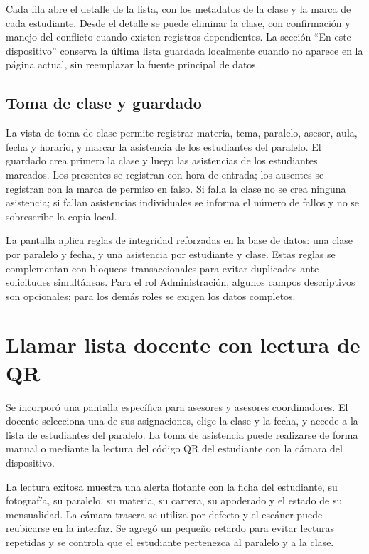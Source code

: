 \documentclass[12pt,a4paper,oneside]{report}
\begin{document}
Cada fila abre el detalle de la lista, con los metadatos de la clase y la marca de cada estudiante. Desde el detalle se puede eliminar la clase, con confirmación y manejo del conflicto cuando existen registros dependientes. La sección ``En este dispositivo'' conserva la última lista guardada localmente cuando no aparece en la página actual, sin reemplazar la fuente principal de datos.

\subsection{Toma de clase y guardado}

La vista de toma de clase permite registrar materia, tema, paralelo, asesor, aula, fecha y horario, y marcar la asistencia de los estudiantes del paralelo. El guardado crea primero la clase y luego las asistencias de los estudiantes marcados. Los presentes se registran con hora de entrada; los ausentes se registran con la marca de permiso en falso. Si falla la clase no se crea ninguna asistencia; si fallan asistencias individuales se informa el número de fallos y no se sobrescribe la copia local.

La pantalla aplica reglas de integridad reforzadas en la base de datos: una clase por paralelo y fecha, y una asistencia por estudiante y clase. Estas reglas se complementan con bloqueos transaccionales para evitar duplicados ante solicitudes simultáneas. Para el rol Administración, algunos campos descriptivos son opcionales; para los demás roles se exigen los datos completos.

\section{Llamar lista docente con lectura de QR}

Se incorporó una pantalla específica para asesores y asesores coordinadores. El docente selecciona una de sus asignaciones, elige la clase y la fecha, y accede a la lista de estudiantes del paralelo. La toma de asistencia puede realizarse de forma manual o mediante la lectura del código QR del estudiante con la cámara del dispositivo.

La lectura exitosa muestra una alerta flotante con la ficha del estudiante, su fotografía, su paralelo, su materia, su carrera, su apoderado y el estado de su mensualidad. La cámara trasera se utiliza por defecto y el escáner puede reubicarse en la interfaz. Se agregó un pequeño retardo para evitar lecturas repetidas y se controla que el estudiante pertenezca al paralelo y a la clase.
\end{document}
